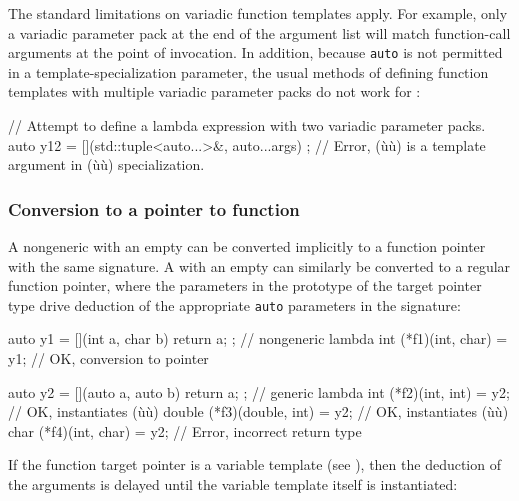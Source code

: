{\noindent The standard limitations on variadic function templates apply. For
example, only a variadic parameter pack at the end of the argument list
will match function-call arguments at the point of invocation. In
addition, because \lstinline!auto! is not permitted in a
template-specialization parameter, the usual methods of defining
function templates with multiple variadic parameter packs do not work
for :

\begin{emcppslisting}
// Attempt to define a lambda expression with two variadic parameter packs.
auto y12 = [](std::tuple<auto...>&, auto...args) { };
    // Error, (ù{}ù) is a template argument in (ù{}ù) specialization.
\end{emcppslisting}
    

\subsubsection[Conversion to a pointer to function]{Conversion to a pointer to function}\label{conversion-to-a-pointer-to-function}

A nongeneric  with an empty  can be converted implicitly to a function pointer with the same
signature. A  with an empty  can similarly be converted to a regular function pointer, where
the parameters in the prototype of the target pointer type drive
deduction of the appropriate \lstinline!auto! parameters in the
 signature:

\begin{emcppslisting}[emcppsbatch=e3,emcppsstandards={c++14}]
auto y1 = [](int a, char b) { return a; };   // nongeneric lambda
int (*f1)(int, char) = y1;                   // OK, conversion to pointer

auto y2 = [](auto a, auto b) { return a; };  // generic lambda
int    (*f2)(int, int)    = y2;  // OK, instantiates (ù{}ù)
double (*f3)(double, int) = y2;  // OK, instantiates (ù{}ù)
char   (*f4)(int, char)   = y2;  // Error, incorrect return type
\end{emcppslisting}
    

\noindent If the function target pointer is a variable template (see
), then the deduction of the arguments is
delayed until the variable template itself is instantiated:

}
